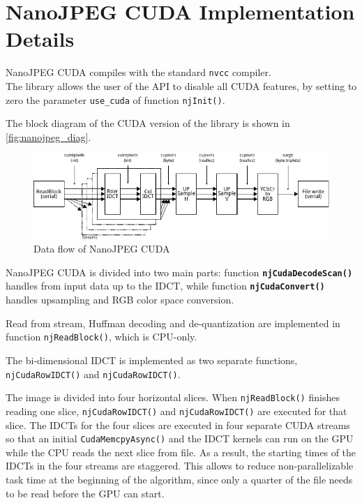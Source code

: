 \section{NanoJPEG CUDA Implementation Details}

NanoJPEG CUDA compiles with the standard \texttt{nvcc} compiler.\\
The library allows the user of the API to disable all CUDA features, by setting to zero the parameter \texttt{use\_cuda} of function \texttt{njInit()}.

The block diagram of the CUDA version of the library is shown in \autoref{fig:nanojpeg_diag}.
\begin{figure}[h]
    \centering
    \includegraphics[width=1\textwidth]{Pictures/flow01.pdf}
    \caption{Data flow of NanoJPEG CUDA}
    \label{fig:nanojpeg_diag}
\end{figure}

NanoJPEG CUDA is divided into two main parts: function \texttt{\textbf{njCudaDecodeScan()}} handles from input data up to the IDCT, while function \texttt{\textbf{njCudaConvert()}} handles upsampling and RGB color space conversion.

Read from stream, Huffman decoding and de-quantization are implemented in function \texttt{njReadBlock()}, which is CPU-only.

The bi-dimensional IDCT is implemented as two separate functions, \texttt{njCudaRowIDCT()} and \texttt{njCudaRowIDCT()}.

The image is divided into four horizontal slices. When \texttt{njReadBlock()} finishes reading one slice, \texttt{njCudaRowIDCT()} and \texttt{njCudaRowIDCT()} are executed for that slice. The IDCTs for the four slices are executed in four separate CUDA streams so that an initial \texttt{CudaMemcpyAsync()} and the IDCT kernels can run on the GPU while the CPU reads the next slice from file. As a result, the starting times of the IDCTs in the four streams are staggered. This allows to reduce non-parallelizable task time at the beginning of the algorithm, since only a quarter of the file needs to be read before the GPU can start.

